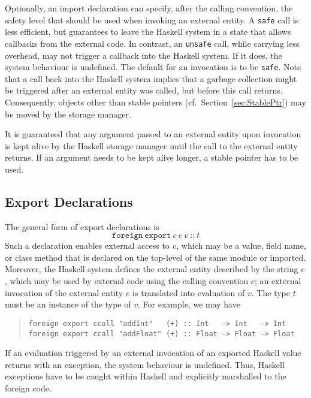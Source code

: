 \documentclass[a4paper,twosides]{article}
\newcommand{\code}[1]{\texttt{#1}}      %
\begin{document}
Optionally, an import declaration can specify, after the calling convention,
the safety level that should be used when invoking an external entity.  A
\code{safe} call is less efficient, but guarantees to leave the Haskell system
in a state that allows callbacks from the external code.  In contrast, an
\code{unsafe} call, while carrying less overhead, may not trigger a callback
into the Haskell system.  If it does, the system behaviour is undefined.  The
default for an invocation is to be \code{safe}.  Note that a call back into
the Haskell system implies that a garbage collection might be triggered after
an external entity was called, but before this call returns.  Consequently,
objects other than stable pointers (cf.\ Section~\ref{sec:StablePtr}) may be
moved by the storage manager.

It is guaranteed that any argument passed to an external entity upon
invocation is kept alive by the Haskell storage manager until the call to the
external entity returns.  If an argument needs to be kept alive longer, a
stable pointer has to be used.

\subsection{Export Declarations}

The general form of export declarations is
%
\[
\code{foreign}~\code{export}~c~e~v~\code{{::}}~t
\]
%
Such a declaration enables external access to $v$, which may be a value, field
name, or class method that is declared on the top-level of the same module or
imported.  Moreover, the Haskell system defines the external entity described
by the string $e$, which may be used by external code using the calling
convention $c$; an external invocation of the external entity $e$ is
translated into evaluation of $v$.  The type $t$ must be an instance of the
type of $v$.  For example, we may have
%
\begin{quote}
\begin{verbatim}
foreign export ccall "addInt"   (+) :: Int   -> Int   -> Int
foreign export ccall "addFloat" (+) :: Float -> Float -> Float
\end{verbatim}
\end{quote}

If an evaluation triggered by an external invocation of an exported Haskell
value returns with an exception, the system behaviour is undefined.  Thus,
Haskell exceptions have to be caught within Haskell and explicitly marshalled
to the foreign code.
\end{document}
